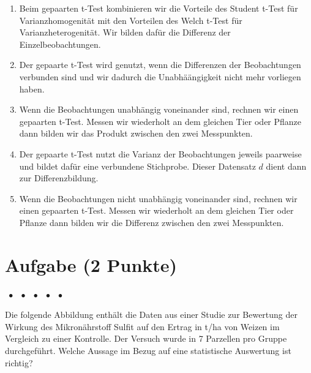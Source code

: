 \documentclass[a4paper, 9pt]{scrartcl}\usepackage[]{graphicx}\usepackage[]{xcolor}
\begin{document}
\begin{enumerate}
\item [\textbf{A} \msquare] Beim gepaarten t-Test kombinieren wir die Vorteile des Student t-Test für Varianzhomogenität mit den Vorteilen des Welch t-Test für Varianzheterogenität. Wir bilden dafür die Differenz der Einzelbeobachtungen.
\item [\textbf{B} \msquare] Der gepaarte t-Test wird genutzt, wenn die Differenzen der Beobachtungen verbunden sind und wir dadurch die Unabhäängigkeit nicht mehr vorliegen haben.
\item [\textbf{C} \msquare] Wenn die Beobachtungen unabhängig voneinander sind, rechnen wir einen gepaarten t-Test. Messen wir wiederholt an dem gleichen Tier oder Pflanze dann bilden wir das Produkt zwischen den zwei Messpunkten.
\item [\textbf{D} \msquare] Der gepaarte t-Test nutzt die Varianz der Beobachtungen jeweils paarweise und bildet dafür eine verbundene Stichprobe. Dieser Datensatz $d$ dient dann zur Differenzbildung.
\item [\textbf{E} \msquare] Wenn die Beobachtungen nicht unabhängig voneinander sind, rechnen wir einen gepaarten t-Test. Messen wir wiederholt an dem gleichen Tier oder Pflanze dann bilden wir die Differenz zwischen den zwei Messpunkten.
\end{enumerate}

\section{Aufgabe \hfill (2 Punkte)}

\ifcollection
\begin{flushright}
\tiny\vspace{-2Ex}
\textbf{\examinhaltstart}
\exammodulemathstat $\;\bullet$
\exammodulestat $\;\bullet$
\exammodulestat $\;\bullet$
\exammodulestatbbv $\;\bullet$
\exammodulestatversuch $\;\bullet$
\exammodulebiostat
\vspace{-1Ex}
\end{flushright}
\fi




Die folgende Abbildung enthält die Daten aus einer Studie zur Bewertung der Wirkung des Mikronährstoff Sulfit auf den Ertrag in t/ha von Weizen im Vergleich zu einer Kontrolle. Der Versuch wurde in 7 Parzellen pro Gruppe durchgeführt. Welche Aussage im Bezug auf eine statistische Auswertung ist richtig?
\end{document}
